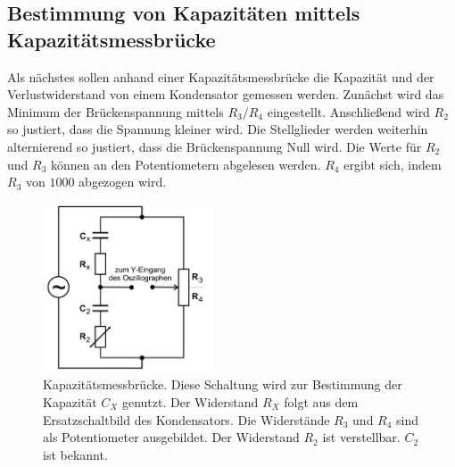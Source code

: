 \subsection{Bestimmung von Kapazitäten mittels Kapazitätsmessbrücke}
Als nächstes sollen anhand einer Kapazitätsmessbrücke die Kapazität und der 
Verlustwiderstand von einem Kondensator gemessen werden.
\newline
Zunächst wird das Minimum der Brückenspannung mittels $R_3/R_4$ eingestellt.
Anschließend wird $R_2$ so justiert, dass die Spannung kleiner wird.
Die Stellglieder werden weiterhin alternierend so justiert, dass die
Brückenspannung Null wird. Die Werte für $R_2$ und $R_3$ können an den
Potentiometern abgelesen werden. $R_4$ ergibt sich, indem $R_3$ von 
$\num{1000}$ abgezogen wird.
\begin{figure}
    \centering
    \includegraphics[width=5cm, height=5cm]{build/kapazitaet.png}
    \caption{Kapazitätsmessbrücke. Diese Schaltung wird zur Bestimmung
    der Kapazität $C_X$ genutzt. Der Widerstand $R_X$ folgt aus dem
    Ersatzschaltbild des Kondensators. Die Widerstände $R_3$ und $R_4$
    sind als Potentiometer ausgebildet. Der Widerstand $R_2$ ist
    verstellbar. $C_2$ ist bekannt.}
    \label{kapazitaet}
\end{figure}

